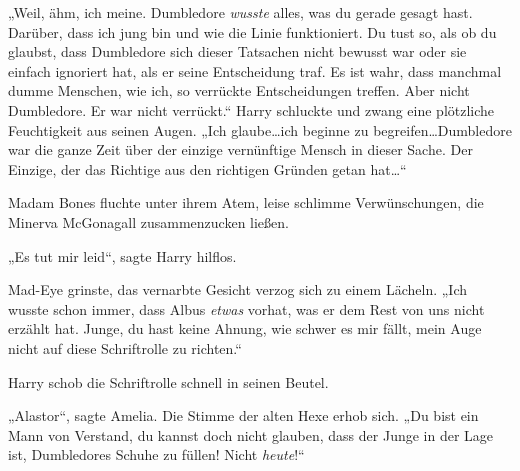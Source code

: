 „Weil, ähm, ich meine. Dumbledore \emph{wusste} alles, was du gerade gesagt hast. Darüber, dass ich jung bin und wie die Linie funktioniert. Du tust so, als ob du glaubst, dass Dumbledore sich dieser Tatsachen nicht bewusst war oder sie einfach ignoriert hat, als er seine Entscheidung traf. Es ist wahr, dass manchmal dumme Menschen, wie ich, so verrückte Entscheidungen treffen. Aber nicht Dumbledore. Er war nicht verrückt.“
Harry schluckte und zwang eine plötzliche Feuchtigkeit aus seinen Augen.
„Ich glaube…ich beginne zu begreifen…Dumbledore war die ganze Zeit über der einzige vernünftige Mensch in dieser Sache. Der Einzige, der das Richtige aus den richtigen Gründen getan hat…“

Madam Bones fluchte unter ihrem Atem, leise schlimme Verwünschungen, die Minerva McGonagall zusammenzucken ließen.

„Es tut mir leid“, sagte Harry hilflos.

Mad-Eye grinste, das vernarbte Gesicht verzog sich zu einem Lächeln.
„Ich wusste schon immer, dass Albus \emph{etwas} vorhat, was er dem Rest von uns nicht erzählt hat. Junge, du hast keine Ahnung, wie schwer es mir fällt, mein Auge nicht auf diese Schriftrolle zu richten.“

Harry schob die Schriftrolle schnell in seinen Beutel.

„Alastor“, sagte Amelia. Die Stimme der alten Hexe erhob sich. „Du bist ein Mann von Verstand, du kannst doch nicht glauben, dass der Junge in der Lage ist, Dumbledores Schuhe zu füllen! Nicht \emph{heute}!“

